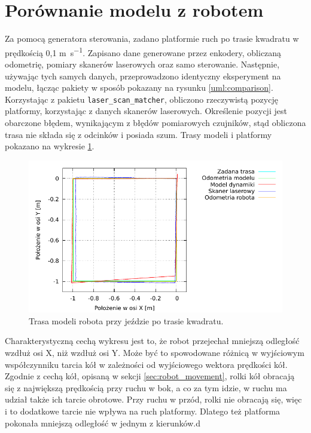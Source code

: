 \section{Porównanie modelu z robotem}
	\label{sec:test_velmobil}
	Za pomocą generatora sterowania, zadano platformie ruch po trasie kwadratu w prędkością 0,1 \si{\metre\per\second}.
	Zapisano dane generowane przez enkodery, obliczaną odometrię, pomiary skanerów laserowych oraz samo sterowanie.
	Następnie, używając tych samych danych, przeprowadzono identyczny eksperyment na modelu, łącząc pakiety w sposób pokazany na rysunku \ref{uml:comparison}.
	Korzystając z pakietu \texttt{laser\_scan\_matcher}, obliczono rzeczywistą pozycję platformy, korzystając z danych skanerów laserowych.
	Określenie pozycji jest obarczone błędem, wynikającym
	z błędów pomiarowych czujników, stąd obliczona trasa nie składa się z odcinków i posiada szum.
	Trasy modeli i platformy pokazano na wykresie \ref{plot:velmobil_xy}.
	
	\begin{figure}[h]
		\centering
		\includegraphics[width=\textwidth]{plots/velmobil_xy.pdf}
			\caption{Trasa modeli robota przy jeździe po trasie kwadratu.}
		\label{plot:velmobil_xy}
	\end{figure}
	
	Charakterystyczną cechą wykresu jest to, że robot przejechał mniejszą odległość wzdłuż osi X, niż wzdłuż osi Y.
	Może być to spowodowane różnicą w wyjściowym współczynniku tarcia kół w zależności od wyjściowego wektora prędkości kół.
	Zgodnie z cechą kół, opisaną w sekcji \ref{sec:robot_movement}, rolki kół obracają się z największą prędkością przy ruchu w bok, a co za tym idzie, w ruchu ma udział także
	ich tarcie obrotowe. Przy ruchu w przód, rolki nie obracają się, więc i to dodatkowe tarcie nie wpływa na ruch platformy.
	Dlatego też platforma pokonała mniejszą odległość w jednym z kierunków.d
	
